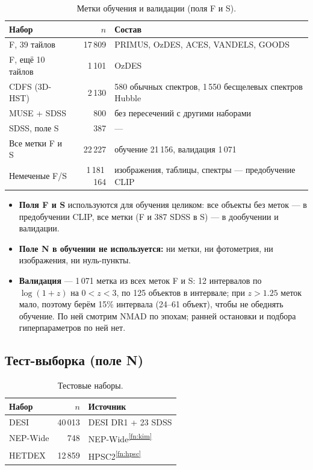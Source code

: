 \documentclass[11pt,a4paper]{article}
\newcommand{\fnref}[1]{\textsuperscript{\ref{#1}}}
\begin{document}
\begin{table}[H]
\centering\small
\caption{Метки обучения и валидации (поля F и S).}
\begin{tabularx}{\linewidth}{lrY}
\toprule
Набор & $n$ & Состав \\
\midrule
F, 39 тайлов & 17\,809 & PRIMUS, OzDES, ACES, VANDELS, GOODS \\
F, ещё 10 тайлов & 1\,101 & OzDES \\
CDFS (3D-HST) & 2\,130 & 580 обычных спектров, 1\,550 бесщелевых спектров Hubble \\
MUSE + SDSS & 800 & без пересечений с другими наборами \\
SDSS, поле S & 387 & — \\
\midrule
Все метки F и S & 22\,227 & обучение 21\,156, валидация 1\,071 \\
Немеченые F/S & 1\,181\,164 & изображения, таблицы, спектры — предобучение CLIP \\
\bottomrule
\end{tabularx}
\end{table}
\begin{itemize}
  \item \textbf{Поля F и S} используются для обучения целиком: все объекты без меток — в предобучении CLIP, все метки (F и 387 SDSS в S) — в дообучении и валидации.
  \item \textbf{Поле N в обучении не используется:} ни метки, ни фотометрия, ни изображения, ни нуль-пункты.
  \item \textbf{Валидация} — 1\,071 метка из всех меток F и S: 12 интервалов по $\log(1+z)$ на $0<z<3$, по 125 объектов в интервале; при $z>1.25$ меток мало, поэтому берём 15\% интервала (24–61 объект), чтобы не обеднять обучение. По ней смотрим NMAD по эпохам; ранней остановки и подбора гиперпараметров по ней нет.
\end{itemize}

\subsection{Тест-выборка (поле N)}

\begin{table}[H]
\centering\small
\caption{Тестовые наборы.}
\begin{tabular}{lrl}
\toprule
Набор & $n$ & Источник \\
\midrule
DESI & 40\,013 & DESI DR1 + 23 SDSS \\
NEP-Wide & 748 & NEP-Wide\fnref{fn:kim} \\
HETDEX & 12\,859 & HPSC2\fnref{fn:hpsc} \\
\bottomrule
\end{tabular}
\end{table}
\end{document}
